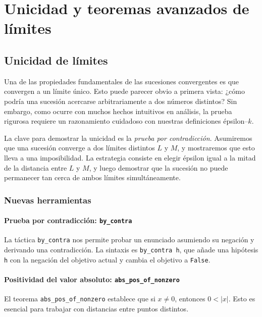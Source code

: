 \chapter{Unicidad y teoremas avanzados de límites}

\section{Unicidad de límites}

Una de las propiedades fundamentales de las sucesiones convergentes es que
convergen a un límite único. Esto puede parecer obvio a primera vista: ¿cómo
podría una sucesión acercarse arbitrariamente a dos números distintos? Sin
embargo, como ocurre con muchos hechos intuitivos en análisis, la prueba
rigurosa requiere un razonamiento cuidadoso con nuestras definiciones
épsilon--$k$.

La clave para demostrar la unicidad es la \emph{prueba por contradicción}.
Asumiremos que una sucesión converge a dos límites distintos $L$ y $M$, y
mostraremos que esto lleva a una imposibilidad. La estrategia consiste en
elegir épsilon igual a la mitad de la distancia entre $L$ y $M$, y luego
demostrar que la sucesión no puede permanecer tan cerca de ambos límites
simultáneamente.

\subsection{Nuevas herramientas}

\subsubsection{Prueba por contradicción: \texttt{by\_contra}}

La táctica \texttt{by\_contra} nos permite probar un enunciado asumiendo su
negación y derivando una contradicción. La sintaxis es
\texttt{by_contra h}, que añade una hipótesis \texttt{h} con la
negación del objetivo actual y cambia el objetivo a \texttt{False}.

\subsubsection{Positividad del valor absoluto: \texttt{abs\_pos\_of\_nonzero}}

El teorema \texttt{abs\_pos\_of\_nonzero} establece que si $x \neq 0$,
entonces $0 < |x|$. Esto es esencial para trabajar con distancias entre
puntos distintos.

